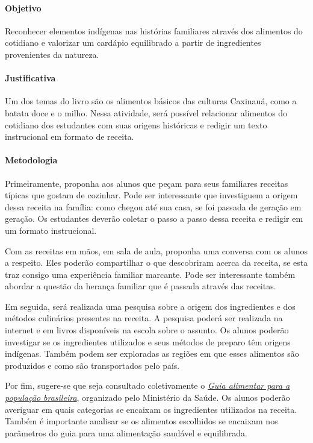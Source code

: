\documentclass[11pt]{extarticle}
\begin{document}
\paragraph{Objetivo} Reconhecer elementos indígenas nas histórias familiares através dos alimentos do cotidiano e valorizar um cardápio equilibrado a partir de ingredientes provenientes da natureza.

\paragraph{Justificativa} Um dos temas do livro são os alimentos básicos das culturas Caxinauá, como a batata doce e o milho. Nessa atividade, será possível relacionar alimentos do cotidiano dos estudantes com suas origens históricas e redigir um texto instrucional em formato de receita.

\paragraph{Metodologia} Primeiramente, proponha aos alunos que peçam para seus familiares receitas típicas que gostam de cozinhar. Pode ser interessante que investiguem a origem dessa receita na família: como chegou até sua casa, se foi passada de geração em geração. Os estudantes deverão coletar o passo a passo dessa receita e redigir em um formato instrucional.

Com as receitas em mãos, em sala de aula, proponha uma conversa com os alunos a respeito. Eles poderão compartilhar o que descobriram acerca da receita, se esta traz consigo uma experiência familiar marcante. Pode ser interessante também abordar a questão da herança familiar que é passada através das receitas.

Em seguida, será realizada uma pesquisa sobre a origem dos ingredientes e dos métodos culinários presentes na receita. A pesquisa poderá ser realizada na internet e em livros disponíveis na escola sobre o assunto. Os alunos poderão investigar se os ingredientes utilizados e seus métodos de preparo têm origens indígenas. Também podem ser exploradas as regiões em que esses alimentos são produzidos e como são transportados pelo país.

Por fim, sugere-se que seja consultado coletivamente o \href{https://bvsms.saude.gov.br/bvs/publicacoes/guia_alimentar_populacao_brasileira_2ed.pdf}{\textit{Guia alimentar para a população brasileira}}, organizado pelo Ministério da Saúde. Os alunos poderão averiguar em quais categorias se encaixam os ingredientes utilizados na receita. Também é importante analisar se os alimentos escolhidos se encaixam nos parâmetros do guia para uma alimentação saudável e equilibrada.
\end{document}
